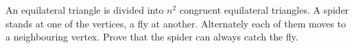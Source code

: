 An equilateral triangle is divided into $n^2$ congruent equilateral triangles. A spider stands at one of the vertices, a fly at another. Alternately each of them moves to a neighbouring vertex. Prove that the spider can always catch the fly.
